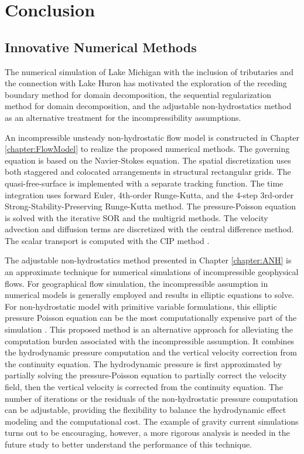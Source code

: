 \chapter{Conclusion}

\section{Innovative Numerical Methods}

The numerical simulation of Lake Michigan with the inclusion of tributaries and the connection with Lake Huron has motivated the exploration of the receding boundary method for domain decomposition, the sequential regularization method for domain decomposition, and the adjustable non-hydrostatics method as an alternative treatment for the incompressibility assumptions.


An incompressible unsteady non-hydrostatic flow model is constructed in Chapter \ref{chapter:FlowModel} to realize the proposed numerical methods. The governing equation is based on the Navier-Stokes equation. The spatial discretization uses both staggered and colocated arrangements in structural rectangular grids. The quasi-free-surface is implemented with a separate tracking function. The time integration uses forward Euler, 4th-order Runge-Kutta, and the 4-step 3rd-order Strong-Stability-Preserving Runge-Kutta method. The pressure-Poisson equation is solved with the iterative SOR and the multigrid methods. The velocity advection and diffusion terms are discretized with the central difference method. The scalar transport is computed with the CIP method \cite{Yabe1991A, Yabe1991B, Yabe01}.


The adjustable non-hydrostatics method presented in Chapter \ref{chapter:ANH} is an approximate technique for numerical simulations of incompressible geophysical flows.
For geographical flow simulation, the incompressible assumption in numerical models is generally employed and results in elliptic equations to solve. For non-hydrostatic model with primitive variable formulations, this elliptic pressure Poisson equation can be the most computationally expensive part of the simulation \cite{Shen04, Stansby1998}.
This proposed method is an alternative approach for alleviating the computation burden associated with the incompressible assumption. It combines the hydrodynamic pressure computation and the vertical velocity correction from the continuity equation. The hydrodynamic pressure is first approximated by partially solving the pressure-Poisson equation to partially correct the velocity field, then the vertical velocity is corrected from the continuity equation. The number of iterations or the residuals of the non-hydrostatic pressure computation can be adjustable, providing the flexibility to balance the hydrodynamic effect modeling and the computational cost. The example of gravity current simulations turns out to be encouraging, however, a more rigorous analysis is needed in the future study to better understand the performance of this technique.


